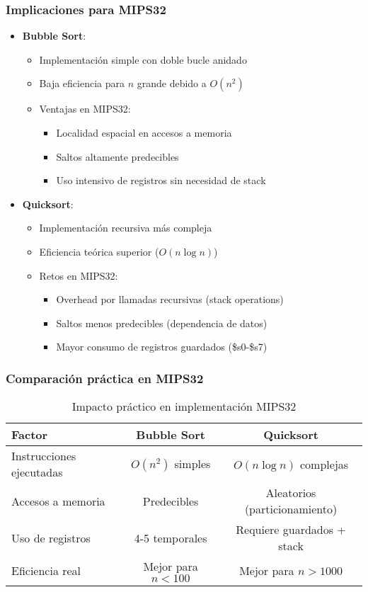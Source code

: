 \documentclass{article}
\begin{document}
\subsubsection*{Implicaciones para MIPS32}

\begin{itemize}
    \item \textbf{Bubble Sort}:
    \begin{itemize}
        \item Implementación simple con doble bucle anidado
        \item Baja eficiencia para $n$ grande debido a $O(n^2)$
        \item Ventajas en MIPS32:
        \begin{itemize}
            \item Localidad espacial en accesos a memoria
            \item Saltos altamente predecibles
            \item Uso intensivo de registros sin necesidad de stack
        \end{itemize}
    \end{itemize}

    \item \textbf{Quicksort}:
    \begin{itemize}
        \item Implementación recursiva más compleja
        \item Eficiencia teórica superior ($O(n \log n)$)
        \item Retos en MIPS32:
        \begin{itemize}
            \item Overhead por llamadas recursivas (stack operations)
            \item Saltos menos predecibles (dependencia de datos)
            \item Mayor consumo de registros guardados (\$s0-\$s7)
        \end{itemize}
    \end{itemize}
\end{itemize}

\subsubsection*{Comparación práctica en MIPS32}

\begin{table}[h]
\centering
\caption{Impacto práctico en implementación MIPS32}
\begin{tabular}{|l|c|c|}
\hline
\textbf{Factor} & \textbf{Bubble Sort} & \textbf{Quicksort} \\
\hline
Instrucciones ejecutadas & $O(n^2)$ simples & $O(n \log n)$ complejas \\
\hline
Accesos a memoria & Predecibles & Aleatorios (particionamiento) \\
\hline
Uso de registros & 4-5 temporales & Requiere guardados + stack \\
\hline
Eficiencia real & Mejor para $n < 100$ & Mejor para $n > 1000$ \\
\hline
\end{tabular}
\end{table}
\end{document}
